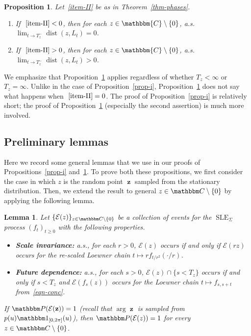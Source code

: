 \documentclass[11pt]{article}
\theoremstyle{plain}
\newtheorem{lem}[thm]{Lemma}
\newtheorem{prop}[thm]{Proposition}
\theoremstyle{definition}
\numberwithin{equation}{section}
\newcommand{\BB}{\mathbbm}
\newcommand{\op}{\operatorname}
\newcommand{\rta}{\rightarrow}
\newcommand{\mcl}{\mathcal}
\newcommand{\SLEG}{{\operatorname{SLE}}_\Sigma}
\newcommand{\dist}{{\operatorname{dist}}}
\newcommand{\zz}{{\op{\mathbf{z}}}}
\begin{document}
\begin{prop} 
\label{prop-ii} Let~\ref{item-II} be as in Theorem~\ref{thm-phases}.
\begin{enumerate}[label=(\alph*)]
    \item \label{item-ii-a}
If $~\ref{item-II} < 0$, then for each $z \in \BB{C} \setminus \{0\} $, a.s.\ $\lim_{t\rta T_z^-} \dist(z,L_t) = 0$.  
\item \label{item-ii-b}
If $~\ref{item-II}>0$, then for each $z \in \BB{C} \setminus \{0\}$, a.s.\ $\lim_{t \rta T_{z}^-} \dist(z,L_t) > 0$.
\end{enumerate}
\end{prop}

We emphasize that Proposition~\ref{prop-ii} applies regardless of whether $T_z < \infty$ or $T_z=\infty$. Unlike in the case of Proposition~\ref{prop-i}, Proposition~\ref{prop-ii} does not say what happens when $~\ref{item-II} = 0$.
The proof of Proposition~\ref{prop-i} is relatively short; the proof of Proposition~\ref{prop-ii} (especially the second assertion) is much more involved. 


\subsection{Preliminary lemmas}

Here we record some general lemmas that we use in our proofs of Propositions~\ref{prop-i} and~\ref{prop-ii}. To prove both these propositions, we first consider the case in which $z$ is the random point $\zz$ sampled from the stationary distribution. Then, we extend the result to general $z\in\BB C\setminus \{0\}$ by applying the following lemma.

\begin{lem} \label{lem-all-z}
Let $\{\mcl E(z)\}_{z\in\BB C\setminus \{0\}}$ be a collection of events for the $\SLEG$ process $(f_t)_{t\geq 0}$ with the following properties.
\begin{itemize}
\item \textbf{Scale invariance:} a.s., for each $r >0$, $\mcl E(z)$ occurs if and only if $\mcl E(r z)$ occurs for the re-scaled Loewner chain $t\mapsto r f_{t/r^2}(\cdot/r)$. 
\item \textbf{Future dependence:} a.s., for each $s > 0$, $\mcl E(z) \cap \{s < T_z \}$ occurs if and only if $s <T_z$ and $\mcl E(f_s(z))$ occurs for the Loewner chain $t\mapsto f_{s,s+t}$ from~\eqref{eqn-conc}. 
\end{itemize}
If $\BB P(\mcl E(\zz)) = 1$ (recall that $\arg \zz$ is sampled from $p(u) \BB 1_{[0,2\pi]}(u)$), then $\BB P(\mcl E(z)) = 1$ for every $z\in\BB C\setminus \{0\}$.
\end{lem}
\end{document}

